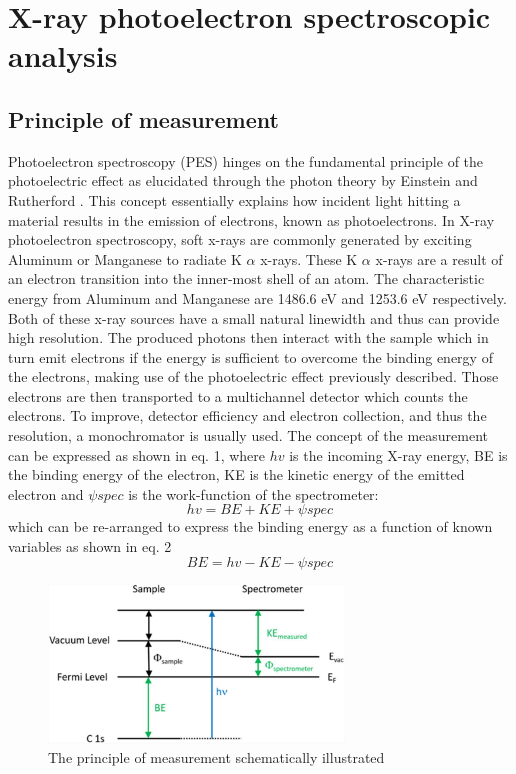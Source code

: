 \label{XPS_theory}
\section{X-ray photoelectron spectroscopic analysis}
\subsection{Principle of measurement}
Photoelectron spectroscopy (PES) hinges on the fundamental principle of the photoelectric effect  as elucidated through the photon theory by Einstein and Rutherford \cite{rutherford_xxxvii_1914, einstein_uber_1905}. This concept essentially explains how incident light hitting a material results in the emission of electrons, known as photoelectrons.
In X-ray photoelectron spectroscopy, soft x-rays are commonly generated by exciting Aluminum or Manganese to radiate K \(\alpha\) x-rays. These K $\alpha$ x-rays are a result of an electron transition into the inner-most shell of an atom. The characteristic energy from Aluminum and Manganese are 1486.6 eV and 1253.6 eV respectively. Both of these x-ray sources have a small natural linewidth and thus can provide high resolution. The produced photons then interact with the sample which in turn emit electrons if the energy is sufficient to overcome the binding energy of the electrons, making use of the photoelectric effect previously described. Those electrons are then transported to a multichannel detector which counts the electrons. To improve, detector efficiency and electron collection, and thus the resolution, a monochromator is usually used.\cite{stevie_introduction_2020} The concept of the measurement can be expressed as shown in eq. 1, where $hv$ is the incoming X-ray energy, BE is the binding energy of the electron, KE is the kinetic energy of the emitted electron and $\psi spec$ is the work-function of the spectrometer:
\begin{equation}
    hv = BE + KE + \psi spec
    \label{eq:hv}
\end{equation}
which can be re-arranged to express the binding energy as a function of known variables \cite{stevie_introduction_2020} as shown in eq. 2
\begin{equation}
    BE = hv- KE - \psi spec
    \label{eq:BE}
\end{equation}

\begin{figure}
    \centering
    \includegraphics[width=0.7\textwidth]{Figures/image4_3.jpeg}
    \caption{The principle of measurement schematically illustrated}
    \label{fig:enter-label}
\end{figure}


